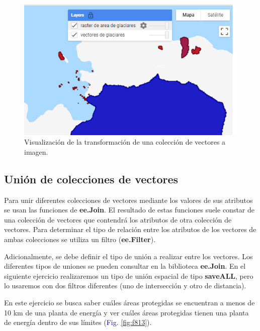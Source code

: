 \documentclass[
  12pt,
  letterpaper,
  twoside]{book}
\newcommand\boldpurple[1]{\textcolor{darkpurple}{\textbf{#1}}}
\begin{document}
\begin{figure}[H]

{\centering \includegraphics[width=0.95\linewidth]{Img/ej24} 

}

\caption{Visualización de la transformación de una colección de vectores a imagen.}\label{fig:f812}
\end{figure}

\hypertarget{uniuxf3n-de-colecciones-de-vectores}{%
\subsection*{Unión de colecciones de vectores}\label{uniuxf3n-de-colecciones-de-vectores}}

Para unir diferentes colecciones de vectores mediante los valores de sus atributos se usan las funciones de \boldpurple{ee.Join}. El resultado de estas funciones suele constar de una colección de vectores que contendrá los atributos de otra colección de vectores. Para determinar el tipo de relación entre los atributos de los vectores de ambas colecciones se utiliza un filtro (\boldpurple{ee.Filter}).

Adicionalmente, se debe definir el tipo de unión a realizar entre los vectores. Los diferentes tipos de uniones se pueden consultar en la biblioteca \boldpurple{ee.Join}. En el siguiente ejercicio realizaremos un tipo de unión espacial de tipo \boldpurple{saveALL}, pero lo usaremos con dos filtros diferentes (uno de intersección y otro de distancia).

En este ejercicio se busca saber cuáles áreas protegidas se encuentran a menos de 10 km de una planta de energía y ver cuáles áreas protegidas tienen una planta de energía dentro de sus límites (\textcolor{darkblue}{Fig.} \ref{fig:f813}).
\end{document}
